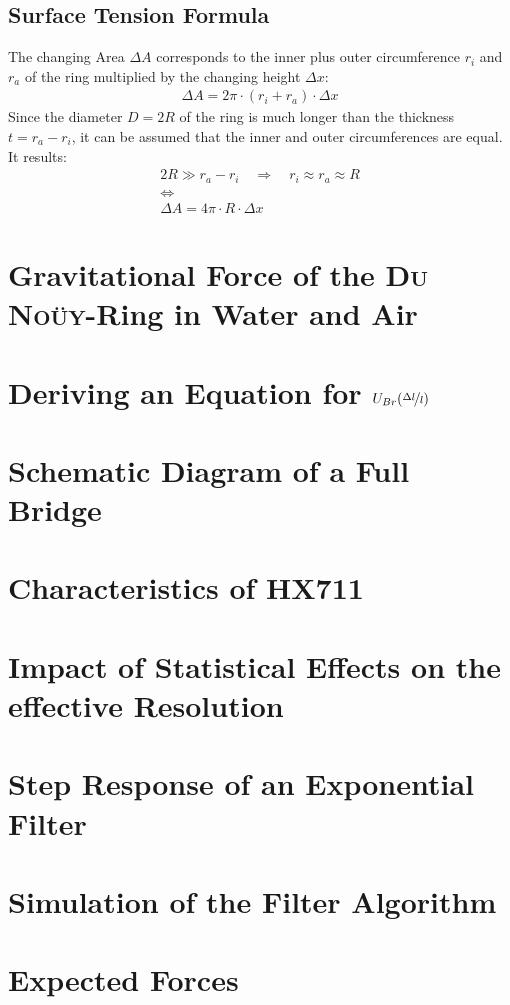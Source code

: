         \subsection*{Surface Tension Formula}\label{sec:A2 derive eq.4}%
            The changing Area $ \Delta A $ corresponds to the inner plus outer circumference $ r_i $ and $ r_a $ of
            the ring multiplied by the changing height $ \Delta x $:
            \begin{align}
                \Delta A = 2\pi \cdot (r_i + r_a) \cdot \Delta x
            \end{align}
            Since the diameter $ D = 2R $ of the ring is much longer than the thickness $ t = r_a - r_i $, it can be assumed
            that the inner and outer circumferences are equal. It results:
            \begin{equation}
                \begin{gathered}
                    2R \gg r_a-r_i \quad \Rightarrow \quad r_i \approx r_a \approx R \\
                    \Leftrightarrow \\
                    \Delta A = 4\pi \cdot R \cdot \Delta x
                \end{gathered}
            \end{equation}
        \section{Gravitational Force of the \textsc{Du Noüy}-Ring in Water and Air}\label{sec:A3 gravi force of du noüy ring}%
        \section{Deriving an Equation for \( U_{Br}(\nicefrac[]{\Delta l}{l}) \)}\label{sec:A4 equation for full bridge circuit}%
        \section{Schematic Diagram of a Full Bridge}\label{sec:A5 schematic diagram full bridge}%
        \section{Characteristics of HX711}\label{sec:A6 characteristics of the HX711}%
        \section{Impact of Statistical Effects on the effective Resolution}\label{sec:A7 statistical effects}%
        \section{Step Response of an Exponential Filter}\label{sec:A8 step response expo filter}%
        \section{Simulation of the Filter Algorithm}\label{sec:A9 simu of the filter algo}%
        \section{Expected Forces}\label{sec:A10 expected forces}%
